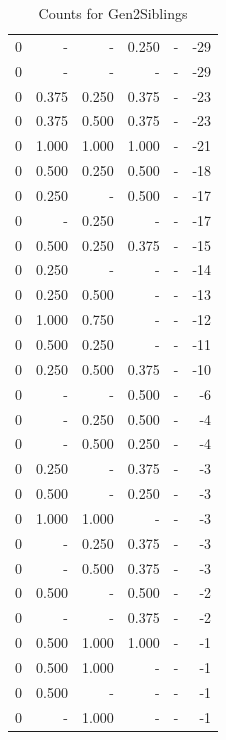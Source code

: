 \documentclass[a4paper]{article}\usepackage{graphicx, color}
\begin{document}
\begin{table}[ht]
\begin{tabular}{rrrrrr}
   \rowcolor{sosoColor} 0 & - & - & 0.250 & - & -29 \\ 
   \rowcolor{nullColor} 0 & - & - & - & - & -29 \\ 
  0 & 0.375 & 0.250 & 0.375 & - & -23 \\ 
  0 & 0.375 & 0.500 & 0.375 & - & -23 \\ 
   \rowcolor{goodColor} 0 & 1.000 & 1.000 & 1.000 & - & -21 \\ 
   \rowcolor{badColor} 0 & 0.500 & 0.250 & 0.500 & - & -18 \\ 
   \rowcolor{sosoColor} 0 & 0.250 & - & 0.500 & - & -17 \\ 
  0 & - & 0.250 & - & - & -17 \\ 
  0 & 0.500 & 0.250 & 0.375 & - & -15 \\ 
   \rowcolor{nullColor} 0 & 0.250 & - & - & - & -14 \\ 
  0 & 0.250 & 0.500 & - & - & -13 \\ 
  0 & 1.000 & 0.750 & - & - & -12 \\ 
  0 & 0.500 & 0.250 & - & - & -11 \\ 
  0 & 0.250 & 0.500 & 0.375 & - & -10 \\ 
   \rowcolor{sosoColor} 0 & - & - & 0.500 & - & -6 \\ 
   \rowcolor{badColor} 0 & - & 0.250 & 0.500 & - & -4 \\ 
   \rowcolor{badColor} 0 & - & 0.500 & 0.250 & - & -4 \\ 
   \rowcolor{sosoColor} 0 & 0.250 & - & 0.375 & - & -3 \\ 
   \rowcolor{sosoColor} 0 & 0.500 & - & 0.250 & - & -3 \\ 
  0 & 1.000 & 1.000 & - & - & -3 \\ 
  0 & - & 0.250 & 0.375 & - & -3 \\ 
  0 & - & 0.500 & 0.375 & - & -3 \\ 
   \rowcolor{sosoColor} 0 & 0.500 & - & 0.500 & - & -2 \\ 
   \rowcolor{sosoColor} 0 & - & - & 0.375 & - & -2 \\ 
   \rowcolor{goodColor} 0 & 0.500 & 1.000 & 1.000 & - & -1 \\ 
  0 & 0.500 & 1.000 & - & - & -1 \\ 
   \rowcolor{nullColor} 0 & 0.500 & - & - & - & -1 \\ 
  0 & - & 1.000 & - & - & -1 \\ 
   \hline
\end{tabular}
\caption{Counts for Gen2Siblings} 
\end{table}
\end{document}
